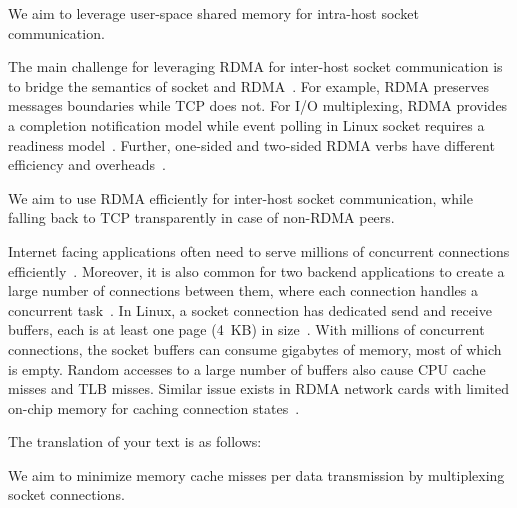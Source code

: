 We aim to leverage user-space shared memory for intra-host socket communication.

The main challenge for leveraging RDMA for inter-host socket communication is to bridge the semantics of socket and RDMA~\cite{dragojevic2014farm}.
For example, RDMA preserves messages boundaries while TCP does not.
For I/O multiplexing, RDMA provides a completion notification model while event polling in Linux socket requires a readiness model~\cite{han2012megapipe}.
Further, one-sided and two-sided RDMA verbs have different efficiency and overheads~\cite{kalia2014using,kaminsky2016design}.

We aim to use RDMA efficiently for inter-host socket communication, while falling back to TCP transparently in case of non-RDMA peers.

Internet facing applications often need to serve millions of concurrent connections efficiently~\cite{jeong2014mtcp,lin2016scalable,belay2017ix}.
Moreover, it is also common for two backend applications to create a large number of connections between them, where each connection handles a concurrent task~\cite{ihm2011towards,jang2011sslshader,nishtala2013scaling}. In Linux, a socket connection has dedicated send and receive buffers, each is at least one page (4~KB) in size~\cite{davidskbs}. With millions of concurrent connections, the socket buffers can consume gigabytes of memory, most of which is empty. Random accesses to a large number of buffers also cause CPU cache misses and TLB misses. Similar issue exists in RDMA network cards with limited on-chip memory for caching connection states~\cite{mprdma,kaminsky2016design}.

The translation of your text is as follows:

We aim to minimize memory cache misses per data transmission by multiplexing socket connections.

